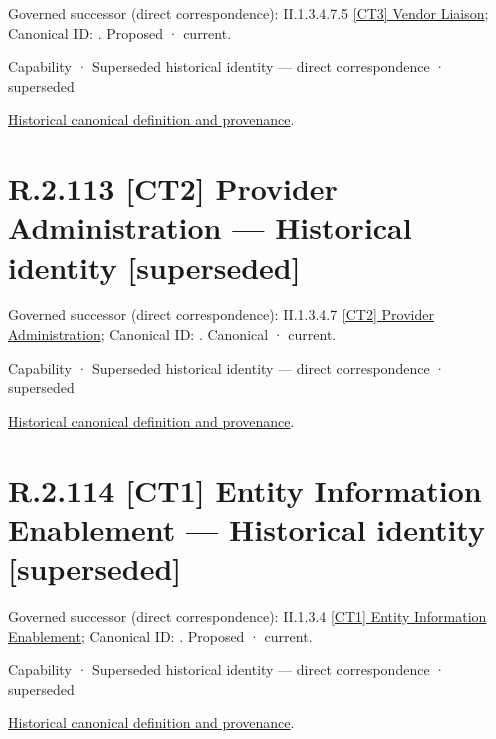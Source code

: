 {\small Governed successor (direct correspondence): II.1.3.4.7.5 \hyperref[element:66358bd6698e4050b12342522fbbb923]{[CT3] Vendor Liaison}; Canonical ID: \texttt{}. Proposed · current.}\par
\label{element:29076cbb9fc5442fb25faf43947574f7}
{\small Capability · Superseded historical identity — direct correspondence · superseded}\par
\href{../../../../continuum/strategy/capability/29076cbb9fc5442fb25faf43947574f7.md}{Historical canonical definition and provenance}.\par
\section*{R.2.113 [CT2] Provider Administration — Historical identity [superseded]}
\label{navigation:R.2.113}

{\small Governed successor (direct correspondence): II.1.3.4.7 \hyperref[element:d6312f85968a4209bafff5ed009297a6]{[CT2] Provider Administration}; Canonical ID: \texttt{}. Canonical · current.}\par
\label{element:a352fd50419d451887c85fcb98566cd5}
{\small Capability · Superseded historical identity — direct correspondence · superseded}\par
\href{../../../../continuum/strategy/capability/a352fd50419d451887c85fcb98566cd5.md}{Historical canonical definition and provenance}.\par
\section*{R.2.114 [CT1] Entity Information Enablement — Historical identity [superseded]}
\label{navigation:R.2.114}

{\small Governed successor (direct correspondence): II.1.3.4 \hyperref[element:b5a92874f8ac4509a30af5253590edc1]{[CT1] Entity Information Enablement}; Canonical ID: \texttt{}. Proposed · current.}\par
\label{element:e4d959d6c71d498c9ce00d2be4c048e3}
{\small Capability · Superseded historical identity — direct correspondence · superseded}\par
\href{../../../../continuum/strategy/capability/e4d959d6c71d498c9ce00d2be4c048e3.md}{Historical canonical definition and provenance}.\par

